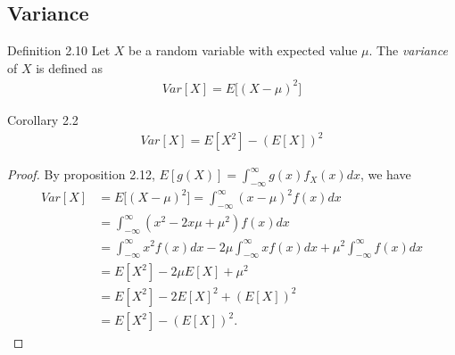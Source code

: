\subsection{Variance}
\begin{boks}{Definition 2.10}
Let $X$ be a random variable with expected value $\mu$. The \textit{variance} of $X$ is defined as
\begin{align*}
    Var[X] = E\Big[ (X - \mu)^2 \Big]
\end{align*}
\end{boks}


\begin{boks}{Corollary 2.2}
\begin{align*}
    Var[X] = E[X^2] - (E[X])^2
\end{align*}
\end{boks}

\begin{proof}
By proposition 2.12, $E[g(X)] = \int_{-\infty}^\infty g(x)f_X(x)dx$, we have
\begin{align*}
    Var[X] &= E\Big[(X-\mu)^2\Big] = \int_{-\infty}^\infty (x - \mu)^2f(x) dx\\
    &= \int_{-\infty}^\infty (x^2 - 2x\mu + \mu^2) f(x) dx \\
    &= \int_{-\infty}^\infty x^2 f(x) dx - 2\mu \int_{-\infty}^\infty x f(x) dx + \mu^2\int_{-\infty}^\infty f(x)dx\\
    &=E[X^2] - 2\mu E[X] + \mu^2\\
    &= E[X^2] - 2 E[X]^2 + (E[X])^2\\
    &= E[X^2] - (E[X])^2.
\end{align*}
\end{proof}

%
